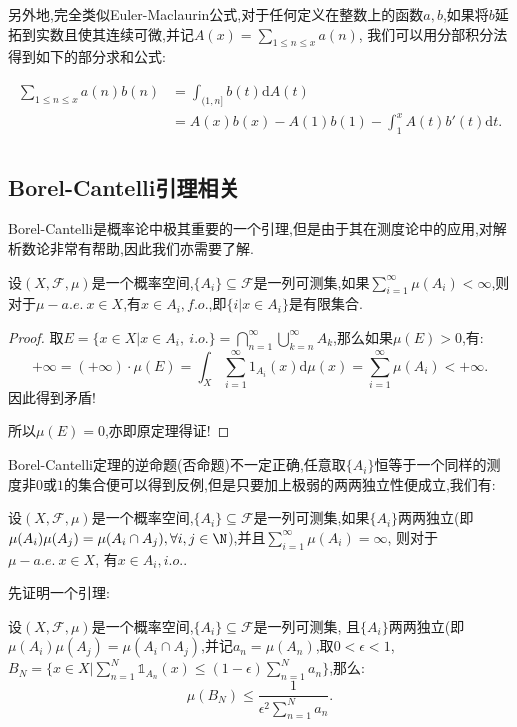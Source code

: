 另外地,完全类似Euler-Maclaurin公式,对于任何定义在整数上的函数$a,b$,如果将$b$延拓到实数且使其连续可微,并记$\displaystyle A(x) = \sum_{1\leq n\leq x}a(n)$,
我们可以用分部积分法得到如下的部分求和公式:

\begin{align}
    \sum_{1\leq n\leq x} a(n)b(n) &= \int_{(1,n]}b(t)\mathrm{d}A(t) \\
    &= A(x)b(x) - A(1)b(1) - \int_1^xA(t)b'(t) \mathrm{d}t.\\
\end{align}
\subsection{Borel-Cantelli引理相关}

Borel-Cantelli是概率论中极其重要的一个引理,但是由于其在测度论中的应用,对解析数论非常有帮助,因此我们亦需要了解.
\begin{theorem}
设$(X,\mathcal{F},\mu)$是一个概率空间,$\{A_i\}\subseteq \mathcal{F}$是一列可测集,如果$\displaystyle\sum_{i=1}^{\infty} \mu(A_i) < \infty$,则对于$\mu-a.e. \  x\in X$,有$x\in A_i, f.o.$,即$\{i|x\in A_i\}$是有限集合.
\end{theorem}

\begin{proof}
 取$\displaystyle E = \{x\in X| x \in A_i,\  i.o.\} = \bigcap_{n=1}^{\infty} \bigcup_{k=n}^{\infty} A_k$,那么如果$\mu(E)>0 $,有:
    $$+\infty = (+\infty) \cdot \mu(E) = \int_{X}\sum_{i=1}^{\infty}\mathrm{1}_{A_i}(x)\mathrm{d}\mu(x) = \sum_{i=1}^{\infty}\mu(A_i) < +\infty.$$
    因此得到矛盾!

    所以$\mu(E) = 0$,亦即原定理得证!
\end{proof}

Borel-Cantelli定理的逆命题(否命题)不一定正确,任意取$\{A_i\}$恒等于一个同样的测度非$0$或$1$的集合便可以得到反例,但是只要加上极弱的两两独立性便成立,我们有:

\begin{theorem}
设$(X,\mathcal{F},\mu)$是一个概率空间,$\{A_i\}\subseteq \mathcal{F}$是一列可测集,如果$\{A_i\}$两两独立(即$\mu(A_i)\mu(A_j) = \mu(A_i \cap A_j),\forall i,j\in \N$),并且$\displaystyle\sum_{i=1}^{\infty} \mu(A_i) = \infty$, 则对于$\mu-a.e.\ x \in X$, 有$x\in A_i, i.o. $.

\end{theorem}
先证明一个引理:

\begin{lemma}
    设$(X,\mathcal{F},\mu)$是一个概率空间,$\{A_i\}\subseteq \mathcal{F}$是一列可测集,
    且$\{A_i\}$两两独立(即$\mu(A_i)\mu(A_j) = \mu(A_i \cap A_j)$,并记$a_n = \mu(A_n)$,取$0<\epsilon<1 $,
    $B_N = \{x\in X | \sum_{n=1}^N \mathbb{1}_{A_n}(x) \leq (1-\epsilon) \sum_{n=1}^{N} a_n\} $,那么:
    $$\mu(B_N) \leq \frac{1}{\epsilon^2\sum_{n=1}^N a_n}.$$

\end{lemma}

